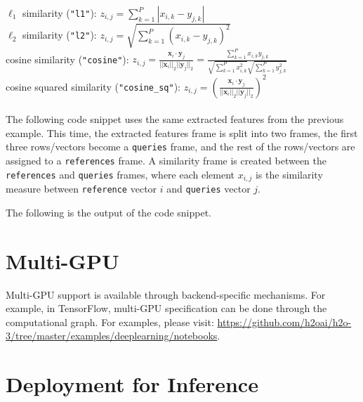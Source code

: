 $\ell_1$ similarity (\texttt{"l1"}): $z_{i,j} = \displaystyle\sum_{k=1}^P|x_{i,k} - y_{j,k}|$\\
$\ell_2$ similarity (\texttt{"l2"}): $z_{i,j} = \sqrt{\displaystyle\sum_{k=1}^P(x_{i,k} - y_{j,k})^2}$\\
cosine similarity (\texttt{"cosine"}): $z_{i,j} = \displaystyle\frac{\mathbf{x}_i \cdot \mathbf{y}_j}{||\mathbf{x}_i||_2||\mathbf{y}_j||_2} = \frac{\displaystyle\sum_{k=1}^P x_{i,k} y_{j,k}}{\sqrt{\displaystyle\sum_{k=1}^Px_{i,k}^2}\sqrt{\displaystyle\sum_{k=1}^Py_{j,k}^2}}$\\
cosine squared similarity (\texttt{"cosine\_sq"}): $z_{i,j} = \left(\displaystyle\frac{\mathbf{x}_i \cdot \mathbf{y}_j}{||\mathbf{x}_i||_2||\mathbf{y}_j||_2}\right)^2$
\\
\\
The following code snippet uses the same extracted features from the previous example.  This time, the extracted features frame is split into two frames, the first three rows/vectors become a \texttt{queries} frame, and the rest of the rows/vectors are assigned to a \texttt{references} frame.  A similarity frame is created between the \texttt{references} and \texttt{queries} frames, where each element $x_{i,j}$ is the similarity measure between \texttt{reference} vector $i$ and \texttt{queries} vector $j$.

\waterExampleInPython


\newpage
The following is the output of the code snippet.



\section{Multi-GPU}
Multi-GPU support is available through backend-specific mechanisms.  For example, in TensorFlow, multi-GPU specification can be done through the computational graph.  For examples, please visit: {\url{https://github.com/h2oai/h2o-3/tree/master/examples/deeplearning/notebooks}}.

\section{Deployment for Inference}
